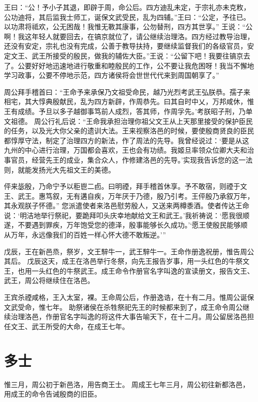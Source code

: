\documentclass[a4paper,12pt,UTF8,twoside]{ctexbook}
\begin{document}
王曰：“公！予小子其退，即辟于周，命公后。四方迪乱未定，于宗礼亦未克敉，公功迪将，其后监我士师工，诞保文武受民，乱为四辅。”王曰：“公定，予往已。以功肃将祗欢，公无困哉！我惟无斁其康事，公勿替刑，四方其世享。”
王说：“公啊！我这年轻人就要回去，在镐京就位了，请公继续治理洛。四方经过教导治理，还没有安定，宗礼也没有完成，公善于教导扶持，要继续监督我们的各级官员，安定文王、武王所接受的殷民，做我的辅佐大臣。”王说：“公留下吧！我要往镐京去了。公要好好地迅速地进行敬重和睦殷民的工作，公不要让我危困呀！我当不懈地学习政事，公要不停地示范，四方诸侯将会世世代代来到周国朝享了。”

周公拜手稽首曰：“王命予来承保乃文祖受命民，越乃光烈考武王弘朕恭。孺子来相宅，其大惇典殷献民，乱为四方新辟，作周恭先。曰其自时中乂，万邦咸休，惟王有成绩。予旦以多子越御事笃前人成烈，答其师，作周孚先。’考朕昭子刑，乃单文祖德。
周公行礼后说：“王命我承担治理你祖父文王从上天那里接受的保护臣民的任务，以及光大你父亲的遗训大法。王来视察洛邑的时候，要使殷商贤良的臣民都惇厚守法，制定了治理四方的新法，作了周法的先导。我曾经说过：‘要是从这九州的中心进行治理，万国都会喜欢，王也会有功绩。我姬旦率领众位卿大夫和治事官员，经营先王的成业，集合众人，作修建洛邑的先导。’实现我告诉您的这一法则，就能发扬光大先祖文王的美德。

伻来毖殷，乃命宁予以秬鬯二卣。曰明禋，拜手稽首休享。予不敢宿，则禋于文王、武王。惠笃叙，无有遘自疾，万年厌于乃德，殷乃引考。王伻殷乃承叙万年，其永观朕子怀德。”
您派遣使者来洛邑慰劳殷人，又送来两樽黍酒。使者传达王命说：‘明洁地举行祭祀，要跪拜叩头庆幸地献给文王和武王。’我祈祷说：‘愿我很顺遂，不要遇到罪疾，万年饱受您的德泽，殷事能够长久成功。’‘愿王使殷民能够顺从万年，永远像我们的百姓一样心怀大德不敢叛逆。’”

戊辰，王在新邑烝，祭岁，文王騂牛一，武王騂牛一。王命作册逸祝册，惟告周公其后。
戊辰这天，成王在洛邑举行冬祭，向先王报告岁事，用一头红色的牛祭文王，也用一头红色的牛祭武王。成王命令作册官名字叫逸的宣读册文，报告文王、武王，周公将继续住在洛邑。

王宾杀禋咸格，王入太室，裸。王命周公后，作册逸诰，在十有二月。惟周公诞保文武受命，惟七年。
助祭诸侯在杀牲祭祀先王的时候都来到了，成王命令周公继续治理洛邑，作册官名字叫逸的将这件大事告喻天下，在十二月。周公留居洛邑担任文王、武王所受的大命，在成王七年。

\chapter{多士}

惟三月，周公初于新邑洛，用告商王士。
周成王七年三月，周公初往新都洛邑，用成王的命令告诫殷商的旧臣。
\end{document}
